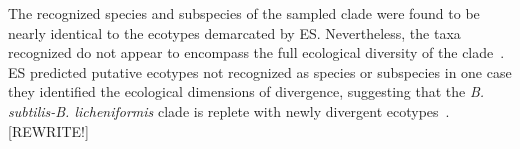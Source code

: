 The recognized species and subspecies of the sampled clade were found to be nearly identical to the ecotypes demarcated by ES.
Nevertheless, the taxa recognized do not appear to encompass the full ecological diversity of the clade~\cite{connor2010ecology}.
ES predicted putative ecotypes not recognized as species or subspecies in one case they identified the ecological dimensions of divergence, suggesting that the \emph{B. subtilis-B. licheniformis} clade is replete with newly divergent ecotypes~\cite{connor2010ecology}. [REWRITE!]

%

